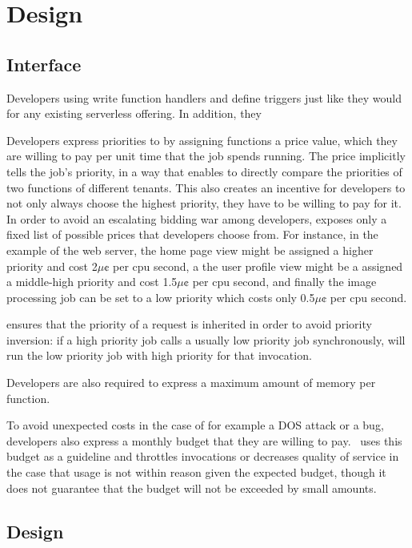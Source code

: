 \section{Design}\label{design}



\subsection{Interface}


Developers using \sys{} write function handlers and define triggers
just like they would for any existing serverless offering. In addition, they 

Developers express priorities to \sys{} by assigning functions a price value,
which they are willing to pay per unit time that the job spends running. The
price implicitly tells \sys{} the job's priority, in a way that enables \sys{}
to directly compare the priorities of two functions of different tenants. This
also creates an incentive for developers to not only always choose the highest
priority, they have to be willing to pay for it. In order to avoid an escalating
bidding war among developers, \sys{} exposes only a fixed list of possible
prices that developers choose from. For instance, in the example of the web
server, the home page view might be assigned a higher priority and cost
2$\mu\cent$ per cpu second, a the user profile view might be a assigned a
middle-high priority and cost 1.5$\mu\cent$ per cpu second, and finally the
image processing job can be set to a low priority which costs only 0.5$\mu\cent$
per cpu second. 

\Sys{} ensures that the priority of a request is inherited in order to avoid
priority inversion: if a high priority job calls a usually low priority job
synchronously, \sys{} will run the low priority job with high priority for that
invocation.

Developers are also required to express a maximum amount of memory per function.
 
To avoid unexpected costs in the case of for example a DOS attack or a bug,
developers also express a monthly budget that they are willing to pay.\ \sys{}
uses this budget as a guideline and throttles invocations or decreases quality
of service in the case that usage is not within reason given the expected
budget, though it does not guarantee that the budget will not be exceeded by
small amounts.



\subsection{\Sys{} Design}

